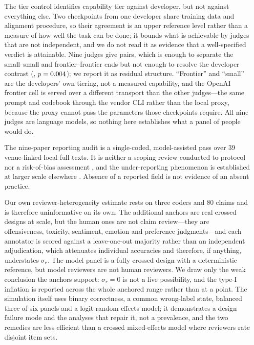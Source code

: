 \documentclass[11pt]{article}
\begin{document}
The tier control identifies capability tier against developer, but not against
everything else. Two checkpoints from one developer share training data and
alignment procedure, so their agreement is an upper reference level rather than
a measure of how well the task can be done; it bounds what is achievable by
judges that are not independent, and we do not read it as evidence that a
well-specified verdict is attainable. Nine judges give \TierNPairs{} pairs,
which is enough to separate the small--small and frontier--frontier ends but not
enough to resolve the developer contrast (\TierDevDiff{}, $p=0.004$); we
report it as residual structure. ``Frontier'' and ``small'' are the developers'
own tiering, not a measured capability, and the OpenAI frontier cell is served
over a different transport than the other judges---the same prompt and codebook
through the vendor CLI rather than the local proxy, because the proxy cannot
pass the parameters those checkpoints require. All nine judges are language
models, so nothing here establishes what a panel of people would do.

The nine-paper reporting audit is a single-coded, model-assisted pass over 39
venue-linked local full texts. It is neither a scoping review conducted to
protocol \citep{prismaScR2018} nor a risk-of-bias assessment
\citep{whiting2011quadas}, and the under-reporting phenomenon is established at
larger scale elsewhere \citep{howcroft2020twenty,vanderlee2021human}. Absence
of a reported field is not evidence of an absent practice.

Our own reviewer-heterogeneity estimate rests on three coders and 80 claims and
is therefore uninformative on its own. The additional anchors are real crossed
designs at scale, but the human ones are not claim review---they are
offensiveness, toxicity, sentiment, emotion and preference judgments---and each
annotator is scored against a leave-one-out majority rather than an independent
adjudication, which attenuates individual accuracies and therefore, if
anything, understates $\sigma_r$. The model panel is a fully crossed design
with a deterministic reference, but model reviewers are not human reviewers. We
draw only the weak conclusion the anchors support: $\sigma_r=0$ is not a live
possibility, and the type-I inflation is reported across the whole anchored
range rather than at a point. The simulation itself uses binary correctness, a
common wrong-label state, balanced three-of-six panels and a logit
random-effects model; it demonstrates a design failure mode and the analyses
that repair it, not a prevalence, and the two remedies are less efficient than
a crossed mixed-effects model where reviewers rate disjoint item sets.
\end{document}
